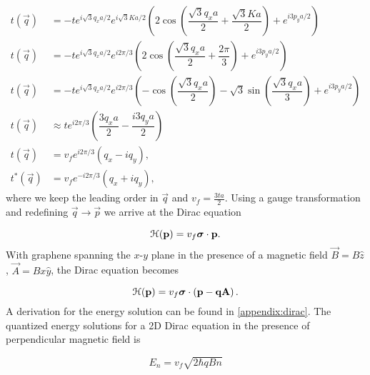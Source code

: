 \begin{align}
  t(\vec{q}) &= -t e^{i\sqrt{3} q_x a / 2} e^{i\sqrt{3} K a / 2} \left( 2\cos{\left( \dfrac{\sqrt{3} q_x a }{2}  + \dfrac{\sqrt{3} K a}{2} \right)} + e^{i 3 p_y a /2 } \right) \nonumber \\
  t(\vec{q}) &= -t e^{i\sqrt{3} q_x a / 2} e^{i 2\pi/3} \left( 2\cos{\left( \dfrac{\sqrt{3} q_x a }{2}  + \dfrac{2\pi}{3} \right)} + e^{i 3 p_y a /2 } \right) \nonumber \\
  t(\vec{q}) &= -t e^{i\sqrt{3} q_x a / 2} e^{i 2\pi/3} \left( -\cos{\left( \dfrac{\sqrt{3} q_x a }{2}\right)} - \sqrt{3}\sin{\left( \dfrac{\sqrt{3}q_x a}{3} \right)} + e^{i 3 p_y a /2 } \right) \nonumber \\
  t(\vec{q}) &\approx t e^{i 2\pi/3} \left(\dfrac{3q_x a}{2} - \dfrac{i3q_y a}{2} \right) \nonumber \\
  t(\vec{q}) &= v_f e^{i 2\pi/3} \left(q_x - iq_y \right), \nonumber \\
  t^*(\vec{q}) &= v_f e^{-i 2\pi/3} \left(q_x + iq_y \right), \nonumber
\end{align}
where we keep the leading order in $\vec{q}$ and $v_f = \tfrac{3ta}{2}$.
Using a gauge transformation and redefining $\vec{q} \rightarrow \vec{p}$ we arrive at the Dirac equation

\begin{equation}
  \mathcal{H}(\mathbf{p}) = v_f \bm{\sigma}\cdot \mathbf{p}.
\end{equation}
With graphene spanning the $x$-$y$ plane in the presence of a magnetic field $\vec{B} = B\hat{z}$, $\vec{A} =  Bx\hat{y}$, the Dirac equation becomes

\begin{equation}
  \mathcal{H}(\mathbf{p}) = v_f \bm{\sigma}\cdot \left(\mathbf{p - q\mathbf{A}} \right).
\end{equation}
A derivation for the energy solution can be found in \ref{appendix:dirac}.
The quantized energy solutions for a 2D Dirac equation in the presence of perpendicular magnetic field is

\begin{equation}
  E_n = v_f \sqrt{2 \hbar qB n}
\end{equation}

